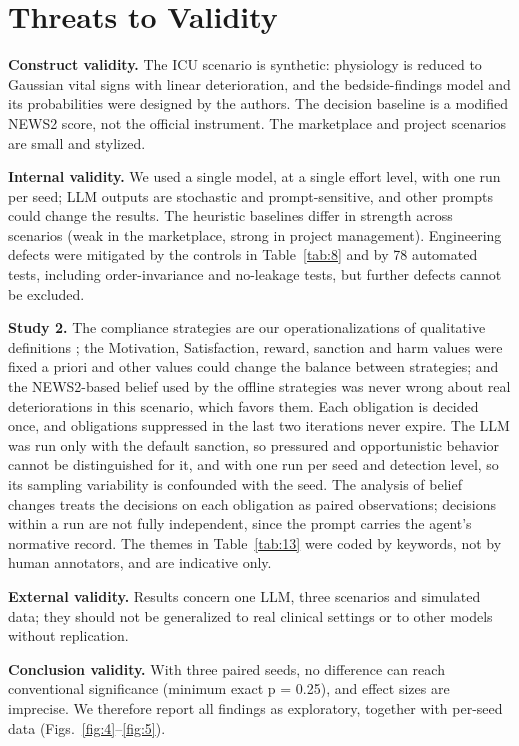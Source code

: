 \documentclass{ieeeaccess}
\begin{document}
\section{Threats to Validity}\label{sec:7}
\textbf{Construct validity.} The ICU scenario is synthetic: physiology is reduced to Gaussian vital signs with linear deterioration, and the bedside-findings model and its probabilities were designed by the authors. The decision baseline is a modified NEWS2 score, not the official instrument. The marketplace and project scenarios are small and stylized.

\textbf{Internal validity.} We used a single model, at a single effort level, with one run per seed; LLM outputs are stochastic and prompt-sensitive, and other prompts could change the results. The heuristic baselines differ in strength across scenarios (weak in the marketplace, strong in project management). Engineering defects were mitigated by the controls in Table~\ref{tab:8} and by 78 automated tests, including order-invariance and no-leakage tests, but further defects cannot be excluded.

\textbf{Study 2.} The compliance strategies are our operationalizations of qualitative definitions \cite{lopez2002constraining}; the Motivation, Satisfaction, reward, sanction and harm values were fixed a priori and other values could change the balance between strategies; and the NEWS2-based belief used by the offline strategies was never wrong about real deteriorations in this scenario, which favors them. Each obligation is decided once, and obligations suppressed in the last two iterations never expire. The LLM was run only with the default sanction, so pressured and opportunistic behavior cannot be distinguished for it, and with one run per seed and detection level, so its sampling variability is confounded with the seed. The analysis of belief changes treats the decisions on each obligation as paired observations; decisions within a run are not fully independent, since the prompt carries the agent's normative record. The themes in Table~\ref{tab:13} were coded by keywords, not by human annotators, and are indicative only.

\textbf{External validity.} Results concern one LLM, three scenarios and simulated data; they should not be generalized to real clinical settings or to other models without replication.

\textbf{Conclusion validity.} With three paired seeds, no difference can reach conventional significance (minimum exact p = 0.25), and effect sizes are imprecise. We therefore report all findings as exploratory, together with per-seed data (Figs.~\ref{fig:4}--\ref{fig:5}).
\end{document}
